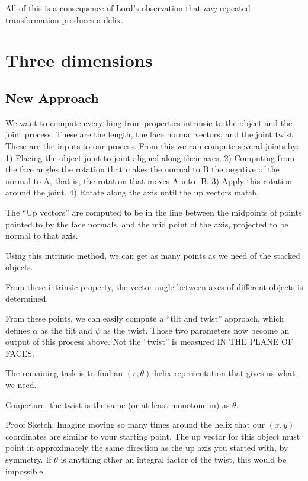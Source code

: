 \documentclass[11pt]{article}
\begin{document}
All of this is a consequence of Lord's observation that {\em any}
repeated transformation produces a delix.


\section{Three dimensions}

\subsection{New Approach}

We want to compute everything from properties intrinsic to the object and the joint process.
These are the length, the face normal vectors, and the joint twist. These are the
inputs to our process.  From this we can compute several joints by:
1) Placing the object joint-to-joint aligned along their axes;
2) Computing from the face angles the rotation that makes the normal to B the
negative of the normal to A, that is, the rotation that moves A into -B.
3) Apply this rotation around the joint.
4) Rotate along the axis until the up vectors match.

The ``Up vectors'' are computed to be in the line between the midpoints of points
pointed to by the face normals, and the mid point of the axis, projected to be normal
to that axis.

Using this intrinsic method, we can get as many points as we need of the stacked objects.

From these intrinsic property, the vector angle between axes of different objects
is determined.

From these points, we can easily compute a ``tilt and twist'' approach, which defines
$\alpha$ as the tilt and $\psi$ as the twist. Those two parameters now become
an output of this process above.  Not the ``twist'' is measured IN THE PLANE OF
FACES.

The remaining task is to find an $(r,\theta)$ helix representation that gives us
what we need.

Conjecture: the twist is the same (or at least monotone in) as $\theta$.

Proof Sketch: Imagine moving so many times around the helix that
our $(x,y)$ coordinates are similar to your starting point. The up vector
for this object must point in approximately the same direction as the up axis
you started with, by symmetry. If $\theta$ is anything other an integral
factor of the twist, this would be impossible.
\end{document}
